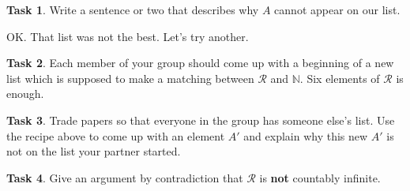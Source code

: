 \documentclass[12pt]{amsart}
\theoremstyle{definition}
\newtheorem{task}{Task}
\begin{document}
\begin{task}
Write a sentence or two that describes why $A$ cannot appear on our list.
\end{task}

OK. That list was not the best. Let's try another.

\begin{task} 
Each member of your group should come up with a beginning of a new list which is supposed to make a matching between $\mathcal{R}$ and $\mathbb{N}$. 
Six elements of $\mathcal{R}$ is enough.
\end{task}

\begin{task} 
Trade papers so that everyone in the group has someone else's list. 
Use the recipe above to come up with an element $A'$ and explain why this new $A'$ is not on the list your partner started.
\end{task}

\begin{task} 
Give an argument by contradiction that $\mathcal{R}$ is \textbf{not} countably infinite.
\end{task}
\end{document}
